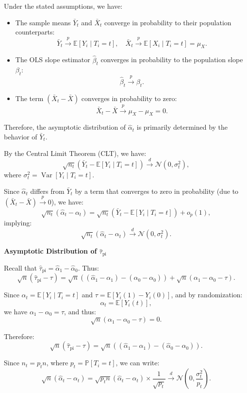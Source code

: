 \documentclass{article}
\begin{document}
Under the stated assumptions, we have:
\begin{itemize}
    \item The sample means $\bar{Y}_t$ and $\bar{X}_t$ converge in probability to their population counterparts:
    \[
    \bar{Y}_t \xrightarrow{p} \mathbb{E}[Y_i \mid T_i = t], \quad \bar{X}_t \xrightarrow{p} \mathbb{E}[X_i \mid T_i = t] = \mu_X.
    \]
    \item The OLS slope estimator $\hat{\beta}_t$ converges in probability to the population slope $\beta_t$:
    \[
    \hat{\beta}_t \xrightarrow{p} \beta_t.
    \]
    \item The term $(\bar{X}_t - \bar{X})$ converges in probability to zero:
    \[
    \bar{X}_t - \bar{X} \xrightarrow{p} \mu_X - \mu_X = 0.
    \]
\end{itemize}

Therefore, the asymptotic distribution of $\hat{\alpha}_t$ is primarily determined by the behavior of $\bar{Y}_t$.

By the Central Limit Theorem (CLT), we have:
\[
\sqrt{n_t} (\bar{Y}_t - \mathbb{E}[Y_i \mid T_i = t]) \xrightarrow{d} \mathcal{N}(0, \sigma_t^2),
\]
where $\sigma_t^2 = \operatorname{Var}[Y_i \mid T_i = t]$.


Since $\hat{\alpha}_t$ differs from $\bar{Y}_t$ by a term that converges to zero in probability (due to $(\bar{X}_t - \bar{X}) \xrightarrow{p} 0$), we have:
\[
\sqrt{n_t} (\hat{\alpha}_t - \alpha_t) = \sqrt{n_t} (\bar{Y}_t - \mathbb{E}[Y_i \mid T_i = t]) + o_p(1),
\]
implying:
\[
\sqrt{n_t} (\hat{\alpha}_t - \alpha_t) \xrightarrow{d} \mathcal{N}(0, \sigma_t^2).
\]

\textbf{Asymptotic Distribution of $\hat{\tau}_{\text{pi}}$}

Recall that $\hat{\tau}_{\text{pi}} = \hat{\alpha}_1 - \hat{\alpha}_0$. Thus:
\[
\sqrt{n} (\hat{\tau}_{\text{pi}} - \tau) = \sqrt{n} \left( (\hat{\alpha}_1 - \alpha_1) - (\hat{\alpha}_0 - \alpha_0) \right) + \sqrt{n} (\alpha_1 - \alpha_0 - \tau).
\]

Since $\alpha_t = \mathbb{E}[Y_i \mid T_i = t]$ and $\tau = \mathbb{E}[Y_i(1) - Y_i(0)]$, and by randomization:
\[
\alpha_t = \mathbb{E}[Y_i(t)],
\]
we have $\alpha_1 - \alpha_0 = \tau$, and thus:
\[
\sqrt{n} (\alpha_1 - \alpha_0 - \tau) = 0.
\]

Therefore:
\[
\sqrt{n} (\hat{\tau}_{\text{pi}} - \tau) = \sqrt{n} \left( (\hat{\alpha}_1 - \alpha_1) - (\hat{\alpha}_0 - \alpha_0) \right).
\]

Since $n_t = p_t n$, where $p_t = \mathbb{P}[T_i = t]$, we can write:
\[
\sqrt{n} (\hat{\alpha}_t - \alpha_t) = \sqrt{p_t n} (\hat{\alpha}_t - \alpha_t) \times \frac{1}{\sqrt{p_t}} \xrightarrow{d} \mathcal{N}\left(0, \frac{\sigma_t^2}{p_t}\right).
\]
\end{document}

